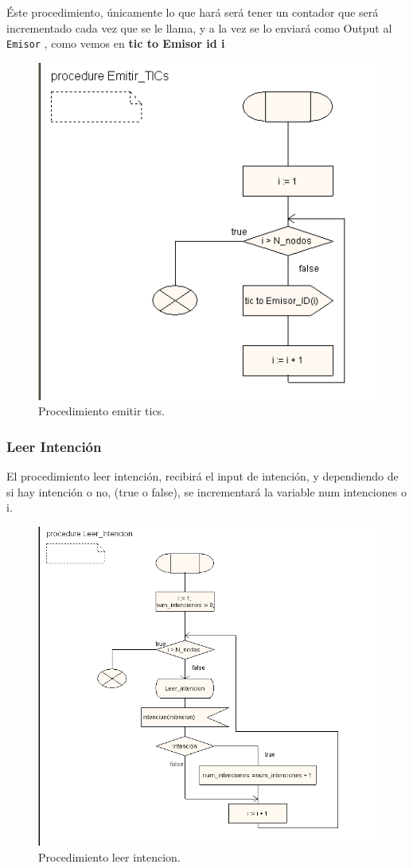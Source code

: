 \documentclass{article}
\begin{document}
Éste procedimiento, únicamente lo que hará será tener un contador que será  incrementado cada vez que se le llama, y a la vez se lo enviará como Output al \verb|Emisor| , como vemos en \textbf{tic to Emisor id i}

\begin{figure}[hbt]
    \centering
    \includegraphics[width=0.4\linewidth]{src/proc emitir tics.png}
    \caption{\label{fig:emitirtics} Procedimiento emitir tics.}
\end{figure}

\subsubsection{Leer Intención}

El procedimiento leer intención, recibirá el input de intención, y dependiendo de si hay intención o no, (true o false), se incrementará la variable num intenciones o i.

\quad

\begin{figure}[h]
    \centering
    \includegraphics[width=0.6\linewidth]{src/leer intencion.png}
    \caption{\label{fig:leerintencion} Procedimiento leer intencion.}
\end{figure}
\end{document}
